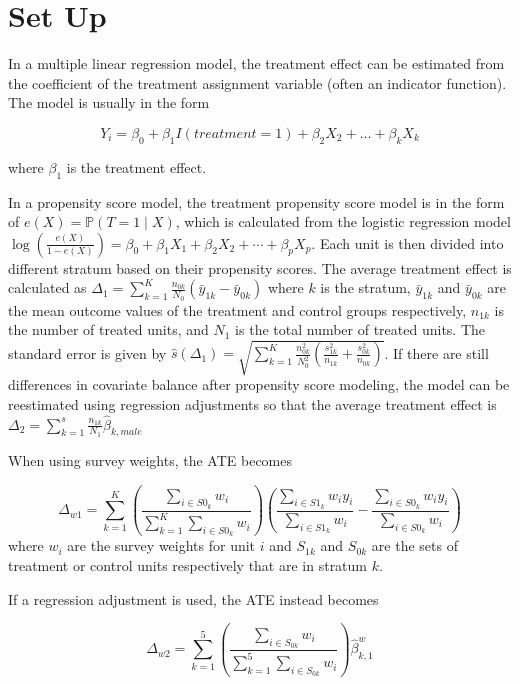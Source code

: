 \documentclass[12pt]{article}
\begin{document}
\section{Set Up}

In a multiple linear regression model, the treatment effect can be estimated from the coefficient of the treatment assignment variable (often an indicator function). The model is usually in the form

$$
Y_i = \beta_0 + \beta_1 I(treatment = 1) + \beta_2 X_2 + ... + \beta_k X_k
$$

where $\beta_1$ is the treatment effect.

In a propensity score model, the treatment propensity score model is in the form of $e(X) = \mathbb{P}(T = 1 \mid X)$, which is calculated from the logistic regression model $\log\left( \frac{e(X)}{1 - e(X)} \right) = \beta_0 + \beta_1 X_1 + \beta_2 X_2 + \cdots + \beta_p X_p$. Each unit is then divided into different stratum based on their propensity scores. The average treatment effect is calculated as $ \Delta_1 = \sum_{k=1}^K \frac{n_{0k}}{N_0}(\bar{y}_{1k} - \bar{y}_{0k})$ where $k$ is the stratum, $\bar{y}_{1k}$ and $\bar{y}_{0k}$ are the mean outcome values of the treatment and control groups respectively, $n_{1k}$ is the number of treated units, and $N_1$ is the total number of treated units. The standard error is given by $\hat{s}(\Delta_1) = \sqrt{\sum_{k=1}^K \frac{n_{0k}^2}{N_0^2} (\frac{s^2_{1k}}{n_{1k}} + \frac{s^2_{0k}}{n_{0k}})}$. If there are still differences in covariate balance after propensity score modeling, the model can be reestimated using regression adjustments so that the average treatment effect is $\Delta_2 = \sum_{k=1}^s \frac{n_{1k}}{N_1} \hat{\beta}_{k,male}$ 

When using survey weights, the ATE becomes

$$
\Delta_{w1} = \sum_{k=1}^{K} \left( 
\frac{\sum_{i \in S0_k} w_i}{\sum_{k=1}^{K} \sum_{i \in S0_k} w_i} 
\right) \left( 
\frac{\sum_{i \in S1_k} w_i y_i}{\sum_{i \in S1_k} w_i} - 
\frac{\sum_{i \in S0_k} w_i y_i}{\sum_{i \in S0_k} w_i} 
\right)
$$
where $w_i$ are the survey weights for unit $i$ and $S_{1k}$ and $S_{0k}$ are the sets of treatment or control units respectively that are in stratum $k$.

If a regression adjustment is used, the ATE instead becomes 

$$ 
\Delta_{w2} = \sum_{k=1}^{5} 
\left( 
\frac{\sum_{i \in S_{0k}} w_i}{\sum_{k=1}^{5} \sum_{i \in S_{0k}} w_i} 
\right) 
\hat{\beta}^{w}_{k,1}
$$
\end{document}
